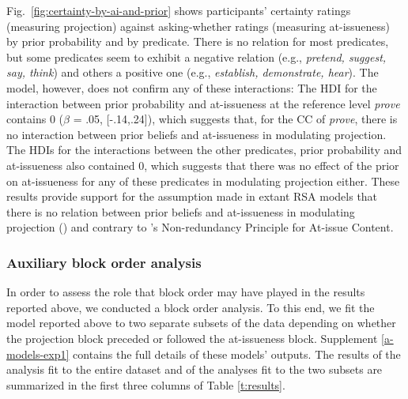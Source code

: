 \documentclass[11pt,fleqn]{article}
\newcommand{\6}{\mbox{$[\hspace*{-.6mm}[$}}
\newcommand{\9}{\mbox{$]\hspace*{-.6mm}]$}}
\newcommand{\citepos}[1]{\citeauthor{#1}'s \citeyear{#1}}
\begin{document}
Fig.~\ref{fig:certainty-by-ai-and-prior} shows participants' certainty ratings (measuring projection) against asking-whether ratings (measuring at-issueness) by prior probability and by predicate. There is no relation for most predicates, but some predicates seem to exhibit a negative relation (e.g., {\em pretend, suggest, say, think}) and others a positive one (e.g., {\em establish, demonstrate, hear}). The model, however, does not confirm any of these interactions: The HDI for the interaction between prior probability and at-issueness at the reference level {\em prove} contains 0 ($\beta$ = .05, [-.14,.24]), which suggests that, for the CC of {\em prove}, there is no interaction between prior beliefs and at-issueness in modulating projection. The HDIs for the interactions between the other predicates, prior probability and at-issueness also contained 0, which suggests that there was no effect of the prior on at-issueness for any of these predicates in modulating projection either.  These results provide support for the assumption made in extant RSA models that there is no relation between prior beliefs and at-issueness in modulating projection (\citealt{qing-etal2016,stevens-etal2017,warstadt2022,pan-degen2023}) and contrary to \citepos{tonhauser-etal-eval} Non-redundancy Principle for At-issue Content.

\subsubsection{Auxiliary block order analysis}\label{s:exp1-aux-analysis}

In order to assess the role that block order may have played in the results reported above, we conducted a block order analysis. To this end, we fit the model reported above to two separate subsets of the data depending on whether the  projection block preceded or followed the at-issueness block. Supplement \ref{a-models-exp1} contains the full details of these models' outputs. The results of the analysis fit to the entire dataset and of the analyses fit to the two subsets are summarized in the first three columns of Table \ref{t:results}.

\newpage
\end{document}
